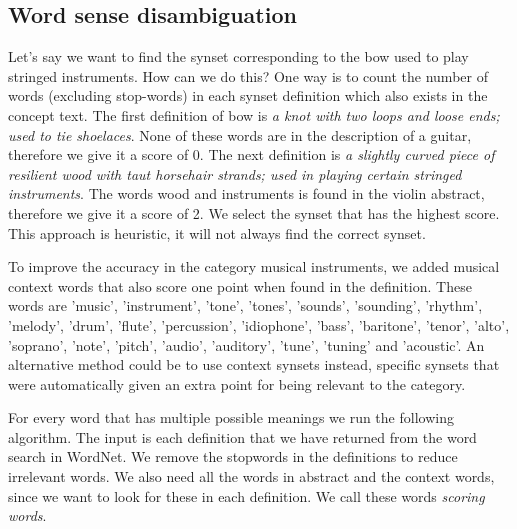 
\subsection{Word sense disambiguation}
Let's say we want to find the synset corresponding to the bow used to play stringed instruments. How can we do this? One way is to count the number of words (excluding stop-words) in each synset definition which also exists in the concept text. The first definition of bow is \emph{a knot with two loops and loose ends; used to tie shoelaces}. None of these words are in the description of a guitar, therefore we give it a score of 0. The next definition is \emph{a slightly curved piece of resilient wood with taut horsehair strands; used in playing certain stringed instruments}. The words wood and instruments is found in the violin abstract, therefore we give it a score of 2. We select the synset that has the highest score. This approach is heuristic, it will not always find the correct synset.

To improve the accuracy in the category musical instruments, we added musical context words that also score one point when found in the definition. These words are 'music', 'instrument', 'tone', 'tones', 'sounds', 'sounding', 'rhythm', 'melody', 'drum', 'flute', 'percussion', 'idiophone',
'bass', 'baritone', 'tenor', 'alto', 'soprano', 'note', 'pitch', 'audio', 'auditory', 'tune', 'tuning' and 'acoustic'.
An alternative method could be to use context synsets instead, specific synsets that were automatically given an extra point for being relevant to the category.

For every word that has multiple possible meanings we run the following algorithm. The input is each definition that we have returned from the word search in WordNet. We remove the stopwords in the definitions to reduce irrelevant words. We also need all the words in abstract and the context words, since we want to look for these in each definition. We call these words \textit{scoring words}.

